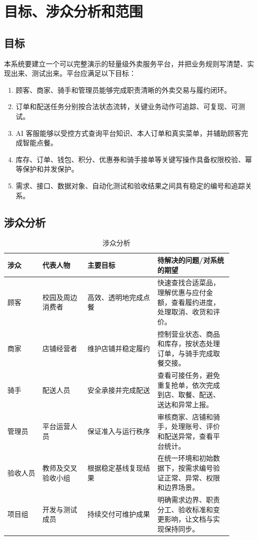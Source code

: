 \section{目标、涉众分析和范围}

\subsection{目标}

本系统要建立一个可以完整演示的轻量级外卖服务平台，并把业务规则写清楚、实现出来、测试出来。平台应满足以下目标：

\begin{enumerate}
  \item 顾客、商家、骑手和管理员能够完成职责清晰的外卖交易与履约闭环。
  \item 订单和配送任务分别按合法状态流转，关键业务动作可追踪、可复现、可测试。
  \item AI 客服能够以受控方式查询平台知识、本人订单和真实菜单，并辅助顾客完成智能点餐。
  \item 库存、订单、钱包、积分、优惠券和骑手接单等关键写操作具备权限校验、幂等保护和并发保护。
  \item 需求、接口、数据对象、自动化测试和验收结果之间具有稳定的编号和追踪关系。
\end{enumerate}

\subsection{涉众分析}

\begin{longtable}{|L{0.14\linewidth}|L{0.18\linewidth}|L{0.28\linewidth}|L{0.30\linewidth}|}
\caption{涉众分析}\label{tab:stakeholders}\\ \hline
\textbf{涉众} & \textbf{代表人物} & \textbf{主要目标} & \textbf{待解决的问题/对系统的期望} \\ \hline
顾客 & 校园及周边消费者 & 高效、透明地完成点餐 & 快速查找合适菜品，理解优惠与应付金额，查看履约进度，处理取消、收货和评价。 \\ \hline
商家 & 店铺经营者 & 维护店铺并稳定履约 & 控制营业状态、商品和库存，按状态处理订单，与骑手完成取餐交接。 \\ \hline
骑手 & 配送人员 & 安全承接并完成配送 & 查看可接任务，避免重复抢单，依次完成到店、取餐、配送、送达和异常上报。 \\ \hline
管理员 & 平台运营人员 & 保证准入与运行秩序 & 审核商家、店铺和骑手，处理账号、评价和配送异常，查看平台统计。 \\ \hline
验收人员 & 教师及交叉验收小组 & 根据稳定基线复现结果 & 在统一环境和初始数据下，按需求编号验证正常、异常、权限和边界场景。 \\ \hline
项目组 & 开发与测试成员 & 持续交付可维护成果 & 明确需求边界、职责分工、验收标准和变更影响，让文档与实现保持同步。 \\ \hline
\end{longtable}

